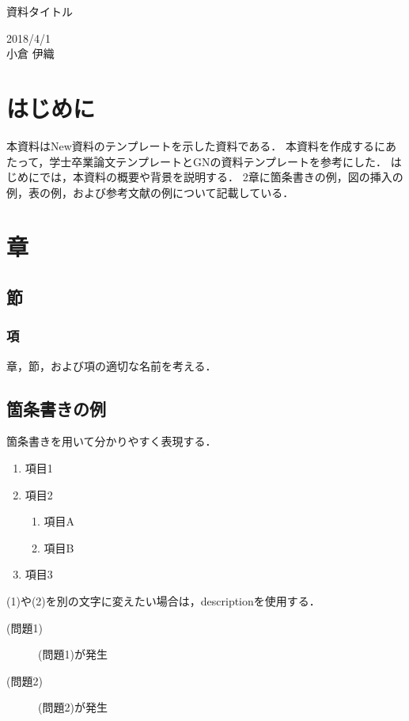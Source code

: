 \documentclass[12pt]{jsarticle}
\begin{document}
\begin{center}
{\LARGE 資料タイトル}
\end{center}

\begin{flushright}
  2018/4/1\\
  小倉 伊織
\end{flushright}
\section{はじめに}
\label{sec:introduction}
本資料はNew資料のテンプレートを示した資料である．
本資料を作成するにあたって，学士卒業論文テンプレートとGNの資料テンプレートを参考にした．
はじめにでは，本資料の概要や背景を説明する．
2章に箇条書きの例，図の挿入の例，表の例，および参考文献の例について記載している．


\section{章}\label{sec:hoge}
\subsection{節}\label{subsec:hoge}
\subsubsection{項}\label{subsubsec:hoge}

章，節，および項の適切な名前を考える．

\subsection{箇条書きの例}
箇条書きを用いて分かりやすく表現する．
\begin{enumerate}
\item 項目1
\item 項目2
  \begin{enumerate}
  \item 項目A
  \item 項目B
  \end{enumerate}
\item 項目3
\end{enumerate}

(1)や(2)を別の文字に変えたい場合は，descriptionを使用する．
\begin{description}
\item[(問題1)] (問題1)が発生
\item[(問題2)] (問題2)が発生
\end{description}
\end{document}

